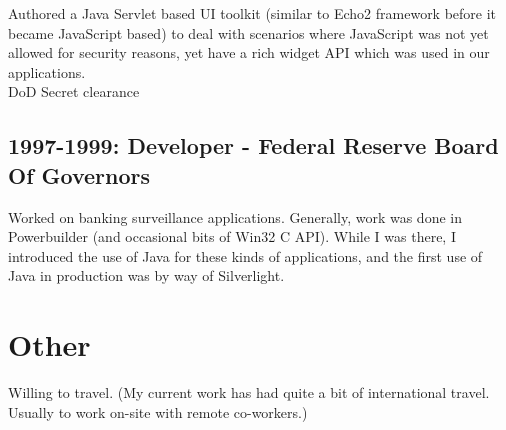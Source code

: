 \documentclass[margin]{res}
\begin{document}
\begin{resume}
Authored a Java Servlet based UI toolkit (similar to Echo2 framework before it became JavaScript based) to deal with scenarios where JavaScript was not yet allowed for security reasons, yet have a rich widget API which was used in our applications. \\
DoD Secret clearance

\subsection{1997-1999: Developer - Federal Reserve Board Of Governors}
Worked on banking surveillance applications.
Generally, work was done in Powerbuilder (and occasional bits of Win32 C API).
While I was there, I introduced the use of Java for these kinds of applications,
and the first use of Java in production was by way of Silverlight.
 
\section{Other}
Willing to travel.  (My current work has had quite a bit of international travel.  Usually to work on-site with remote co-workers.) \\

\end{resume}
\end{document}
